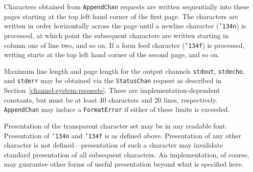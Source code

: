 Characters obtained from \mbox{\tt AppendChan} requests are written
sequentially into these pages starting at the top left hand corner of
the first page.  The characters are written in order horizontally
across the page until a newline character (\mbox{\tt {\char'134}n}) is processed, at
which point the subsequent characters are written starting in column
one of line two, and so on.  If a form feed character (\mbox{\tt {\char'134}f}) is
processed, writing starts at the top left hand corner of the second
page, and so on.

Maximum line length and page length for the output channels \mbox{\tt stdout},
\mbox{\tt stdecho}, and \mbox{\tt stderr} may be obtained via the \mbox{\tt StatusChan} request
as described in Section~\ref{channel-system-requests}.  These are
implementation-dependent constants, but must be at least 40 characters
and 20 lines, respectively.  \mbox{\tt AppendChan} may induce a
\mbox{\tt FormatError} if either of these limits is exceeded.

Presentation of the transparent character set may be in any readable
font.  Presentation of \mbox{\tt {\char'134}n} and \mbox{\tt {\char'134}f} is as defined above.
Presentation of any other character is not defined---presentation of
such a character may invalidate standard presentation
of all subsequent characters.  An implementation, of course, may
guarantee other forms of useful presentation beyond what is
specified here.

